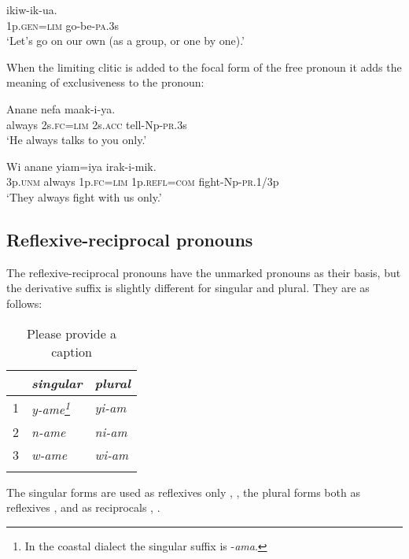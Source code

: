 \ea%
\label{ex:3:x607}
\gll {} ikiw-ik-ua. \\
1p.\textsc{gen}=\textsc{lim} go-be-\textsc{pa}.3s\\
\glt`Let's go on our own (as a group, or one by one).'
\z

When the limiting clitic is added to the focal form of the free pronoun it adds the meaning of exclusiveness to the pronoun:

\ea%
\label{ex:3:x608}
\gll Anane  nefa maak-i-ya. \\
always 2s.\textsc{fc}=\textsc{lim} 2s.\textsc{acc} tell-Np-\textsc{pr}.3s\\
\glt`He always talks to you only.'
\z

\ea%
\label{ex:3:x609}
\gll Wi anane  yiam=iya irak-i-mik. \\
3p.\textsc{unm} always 1p.\textsc{fc}=\textsc{lim} 1p.\textsc{refl}=\textsc{com} fight-Np-\textsc{pr}.1/3p\\
\glt`They always fight with us only.'
\z

\subsection{Reflexive-reciprocal pronouns}\label{sec:3.5.8}
{}
The reflexive-reciprocal pronouns have the unmarked pronouns as their basis, but the derivative suffix is slightly different for singular and plural. They are as follows:

\begin{table}
\caption{Please provide a caption}
\label{} 
\begin{tabular}{l>{\itshape}l>{\itshape}l}
\mytoprule
 &\upshape singular &\upshape plural\\
\midrule
1 &y-ame\footnote{In the coastal dialect the singular suffix is -\textit{ama}.} &yi-am\\
2 &n-ame &ni-am\\
3 &w-ame &wi-am\\
\mybottomrule
\end{tabular}
\end{table}


The singular forms are used as reflexives only , , the plural forms both as reflexives ,  and as reciprocals , .

